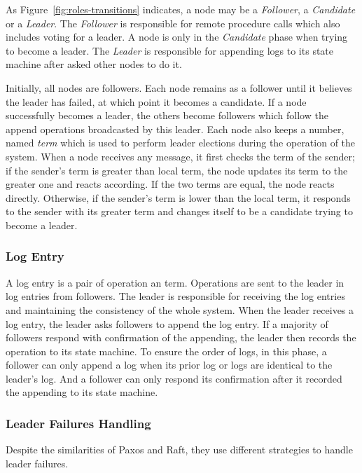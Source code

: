 \documentclass[12pt, a4paper]{article}
\begin{document}
As Figure~\ref{fig:roles-transitions} indicates,
a node may be a \textit{Follower}, a \textit{Candidate} or a \textit{Leader}.
The \textit{Follower} is responsible for remote procedure calls which
also includes voting for a leader. A node is only in the \textit{Candidate} phase when trying to become a leader.
The \textit{Leader} is responsible for appending logs to its state machine after
asked other nodes to do it.

Initially, all nodes are followers.
Each node remains as a follower until
it believes the leader has failed, at which point it becomes a candidate. If a node successfully becomes a leader, the others become followers which follow the append operations broadcasted by this leader. Each node also keeps a number,
named \textit{term} which is used to perform leader elections during
the operation of the system. When a node receives any message,
it first checks the term of the sender; if the sender's term is
greater than local term, the node updates its term to the greater one
and reacts according. If the two terms are equal,
the node reacts directly. Otherwise, if the sender's term is
lower than the local term, it responds to the sender with
its greater term and changes itself to be a candidate trying to become a leader.

\subsubsection{Log Entry}
A log entry is a pair of operation an term. Operations are sent to
the leader in log entries from followers. The leader is responsible for
receiving the log entries and maintaining the consistency of the whole system.
When the leader receives a log entry, the leader asks followers to
append the log entry. If a majority of followers respond
with confirmation of the appending, the leader then records
the operation to its state machine. To ensure the order of logs,
in this phase, a follower can only append a log when
its prior log or logs are identical to the leader's log.
And a follower can only respond its confirmation after
it recorded the appending to its state machine.

\subsubsection{Leader Failures Handling}
Despite the similarities of Paxos and Raft,
they use different strategies to handle leader failures.
\end{document}
